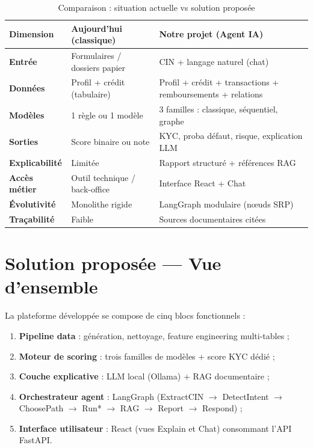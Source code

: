 \begin{table}[H]
  \centering
  \caption{Comparaison : situation actuelle vs solution proposée}
  \label{tab:comparaison}
  \small
  \begin{tabularx}{\textwidth}{|>{\bfseries}p{3.2cm}|X|X|}
    \hline
    Dimension & Aujourd'hui (classique) & Notre projet (Agent IA) \\
    \hline
    Entrée & Formulaires / dossiers papier & CIN + langage naturel (chat) \\
    \hline
    Données & Profil + crédit (tabulaire) & Profil + crédit + transactions + remboursements + relations \\
    \hline
    Modèles & 1 règle ou 1 modèle & 3 familles : classique, séquentiel, graphe \\
    \hline
    Sorties & Score binaire ou note & KYC, proba défaut, risque, explication LLM \\
    \hline
    Explicabilité & Limitée & Rapport structuré + références RAG \\
    \hline
    Accès métier & Outil technique / back-office & Interface React + Chat \\
    \hline
    Évolutivité & Monolithe rigide & LangGraph modulaire (nœuds SRP) \\
    \hline
    Traçabilité & Faible & Sources documentaires citées \\
    \hline
  \end{tabularx}
\end{table}

\section{Solution proposée — Vue d'ensemble}

La plateforme développée se compose de cinq blocs fonctionnels :

\begin{enumerate}[leftmargin=*]
  \item \textbf{Pipeline data} : génération, nettoyage, feature engineering multi-tables ;
  \item \textbf{Moteur de scoring} : trois familles de modèles + score KYC dédié ;
  \item \textbf{Couche explicative} : LLM local (Ollama) + RAG documentaire ;
  \item \textbf{Orchestrateur agent} : LangGraph (ExtractCIN $\rightarrow$ DetectIntent $\rightarrow$ ChoosePath $\rightarrow$ Run* $\rightarrow$ RAG $\rightarrow$ Report $\rightarrow$ Respond) ;
  \item \textbf{Interface utilisateur} : React (vues Explain et Chat) consommant l'API FastAPI.
\end{enumerate}


